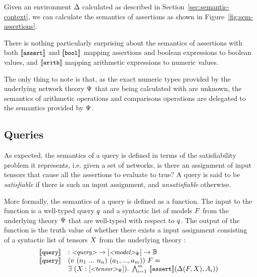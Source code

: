 Given an environment $\Delta$ calculated as described in Section~\ref{sec:semantic-context}, we can calculate the semantics of assertions as shown in Figure~\ref{fig:sem-assertions}. 


There is nothing particularly surprising about the semantics of assertions with both $\llbracket \texttt{\small assert} \rrbracket$ and $\llbracket \texttt{\small bool} \rrbracket$ mapping assertions and boolean expressions to boolean values, and $\llbracket \texttt{\small arith} \rrbracket$ mapping arithmetic expressions to numeric values.


The only thing to note is that, as the exact numeric types provided by the underlying network theory $\Psi$ that are being calculated with are unknown, the semantics of arithmetic operations and comparisons operations are delegated to the semantics provided by $\Psi$.



\subsection{Queries}

As expected, the semantics of a query is defined in terms of the satisfiability problem it represents, i.e. given a set of networks, is there an assignment of input tensors that cause all the assertions to evaluate to true?
A query is said to be \textit{satisfiable} if there is such an input assignment, and \textit{unsatisfiable} otherwise.

More formally, the semantics of a query is defined as a function. The input to the function is a well-typed query $q$ and a syntactic list of models $F$ from the underlying theory $\Psi$ that are well-typed with respect to $q$. The output of the function is the truth value of whether there exists a input assignment consisting of a syntactic list of tensors $X$ from the underlying theory :
\begin{equation*}
\begin{array}{lll}
\llbracket \texttt{\small query} \rrbracket & : \text{\small \textit{<query>}} \rightarrow [\text{\small \textit{<model>}}_\Psi] \rightarrow \mathbb{B} \\
\llbracket \texttt{\small query} \rrbracket & (v ~ (n_1~...~n_n) ~ (a_1,...,a_m))~F = \\
    & \exists~(X : [\text{\small \textit{<tensor>}}_\Psi]). \; \bigwedge^{m}_{i=1}~\llbracket \texttt{\small assert} \rrbracket(\Delta(F,X), A_i)) \\
\end{array}
\end{equation*}

